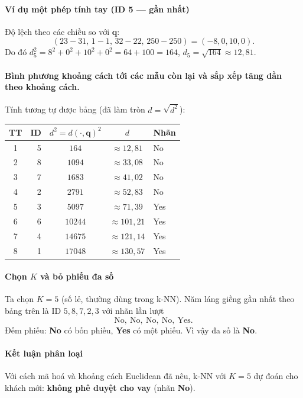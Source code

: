 \paragraph{Ví dụ một phép tính tay (ID 5 --- gần nhất)}
Độ lệch theo các chiều so với $\mathbf{q}$:
\[
(23-31,\,1-1,\,32-22,\,250-250)=(-8,0,10,0).
\]
Do đó $d^{2}_{5}=8^{2}+0^{2}+10^{2}+0^{2}=64+100=164$, $d_{5}=\sqrt{164}\approx 12{,}81$.

\paragraph{Bình phương khoảng cách tới các mẫu còn lại và sắp xếp tăng dần theo khoảng cách.}
Tính tương tự được bảng (đã làm tròn $d=\sqrt{d^2}$):

\begin{center}
{\small
\begin{tabular}{@{}crccl@{}}\toprule
TT & ID & $d^{2}=d(\cdot,\mathbf{q})^{2}$ & $d$ & Nhãn \\\midrule
1 & 5 & $164$ & $\approx 12{,}81$ & No\\
2 & 8 & $1094$ & $\approx 33{,}08$ & No\\
3 & 7 & $1683$ & $\approx 41{,}02$ & No\\
4 & 2 & $2791$ & $\approx 52{,}83$ & No\\
5 & 3 & $5097$ & $\approx 71{,}39$ & Yes\\
6 & 6 & $10244$ & $\approx 101{,}21$ & Yes\\
7 & 4 & $14675$ & $\approx 121{,}14$ & Yes\\
8 & 1 & $17048$ & $\approx 130{,}57$ & Yes\\\bottomrule
\end{tabular}
}
\end{center}

\paragraph{Chọn $K$ và bỏ phiếu đa số}
Ta chọn $K=5$ (số lẻ, thường dùng trong k-NN). Năm láng giềng gần nhất theo bảng trên là ID $5,8,7,2,3$ với nhãn lần lượt
\[
\text{No},\ \text{No},\ \text{No},\ \text{No},\ \text{Yes}.
\]
Đếm phiếu: \textbf{No} có bốn phiếu, \textbf{Yes} có một phiếu. Vì vậy đa số là \textbf{No}.

\paragraph{Kết luận phân loại}
Với cách mã hoá và khoảng cách Euclidean đã nêu, k-NN với $K=5$ dự đoán cho khách mới: \textbf{không phê duyệt cho vay} (nhãn \textbf{No}).

